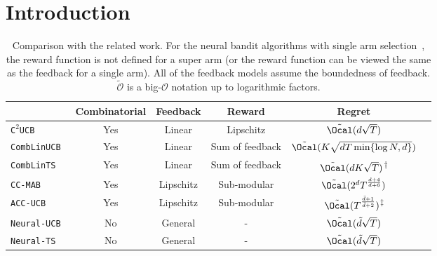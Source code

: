 \documentclass{article}
\theoremstyle{plain}
\begin{document}
\section{Introduction}\label{sec:intro}

\begin{table*}[t!]
\begin{minipage}{\textwidth}
    \centering
    \caption{Comparison with the related work. For the neural bandit algorithms with single arm selection~\cite{zhou2020neural, zhang2021neural}, the reward function is not defined for a super arm (or the reward function can be viewed the same as the feedback for a single arm). All of the feedback models assume the boundedness of feedback.
    $\tilde{\mathcal{O}}$ is a big-$\mathcal{O}$ notation up to logarithmic factors.}
    \begin{tabular}{lccccc}%
         \toprule
          & Combinatorial & Feedback & Reward  & Regret\\
         \midrule
         \texttt{C$^2$UCB}~\cite{qin2014contextual} & Yes & Linear & Lipschitz & $\tilde{\Ocal}(d \sqrt{T})$\\
         \texttt{CombLinUCB}~\cite{wen2015efficient} & Yes & Linear & Sum of feedback & $\tilde{\Ocal}(K\sqrt{d T \min \{ \log N, d\}})$ \\ 
         \texttt{CombLinTS}~\cite{wen2015efficient} & Yes & Linear & Sum of feedback & $\tilde{\Ocal}(d K\sqrt{T})$\textsuperscript{$\dag$} \\
         \texttt{CC-MAB}~\cite{chen2018contextual} & Yes & Lipschitz & Sub-modular & $\tilde{\Ocal}(2^d T^{\frac{d+4}{d+6}})$\\
         \texttt{ACC-UCB}~\cite{nika2020contextual} & Yes & Lipschitz & Sub-modular & $\tilde{\Ocal}(T^{\frac{\bar{d}+1}{\bar{d} + 2}})$\textsuperscript{$\ddag$} \\
         \texttt{Neural-UCB}~\cite{zhou2020neural} & No & General & - & $\tilde{\Ocal}(\tilde{d} \sqrt{T})$ \\
         \texttt{Neural-TS}~\cite{zhang2021neural} & No & General & - & $\tilde{\Ocal}(\tilde{d} \sqrt{T})$ \\

\end{tabular}
\end{minipage}
\end{table*}
\end{document}
